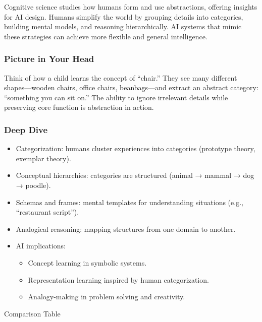 \documentclass[
  letterpaper,
  DIV=11,
  numbers=noendperiod]{scrreprt}
\providecommand{\tightlist}{%
  \setlength{\itemsep}{0pt}\setlength{\parskip}{0pt}}
\begin{document}
Cognitive science studies how humans form and use abstractions, offering
insights for AI design. Humans simplify the world by grouping details
into categories, building mental models, and reasoning hierarchically.
AI systems that mimic these strategies can achieve more flexible and
general intelligence.

\subsubsection{Picture in Your Head}\label{picture-in-your-head-47}

Think of how a child learns the concept of ``chair.'' They see many
different shapes---wooden chairs, office chairs, beanbags---and extract
an abstract category: ``something you can sit on.'' The ability to
ignore irrelevant details while preserving core function is abstraction
in action.

\subsubsection{Deep Dive}\label{deep-dive-47}

\begin{itemize}
\item
  Categorization: humans cluster experiences into categories (prototype
  theory, exemplar theory).
\item
  Conceptual hierarchies: categories are structured (animal → mammal →
  dog → poodle).
\item
  Schemas and frames: mental templates for understanding situations
  (e.g., ``restaurant script'').
\item
  Analogical reasoning: mapping structures from one domain to another.
\item
  AI implications:

  \begin{itemize}
  \tightlist
  \item
    Concept learning in symbolic systems.
  \item
    Representation learning inspired by human categorization.
  \item
    Analogy-making in problem solving and creativity.
  \end{itemize}
\end{itemize}

Comparison Table
\end{document}
